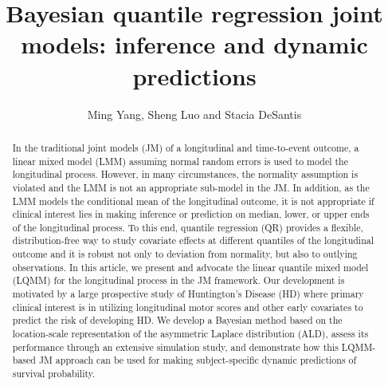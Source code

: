 \documentclass[Crown, sagev, times, doublespace]{sagej}
\begin{document}

\title{Bayesian quantile regression joint models: inference and dynamic predictions}

\author{Ming Yang, Sheng Luo and Stacia DeSantis}




\begin{abstract}
In the traditional joint models (JM) of a longitudinal and time-to-event outcome, a linear mixed model (LMM) assuming normal random errors is used to model the longitudinal process. However, in many circumstances, the normality assumption is violated and the LMM is not an appropriate sub-model in the JM. In addition, as the LMM models the conditional mean of the longitudinal outcome, it is not appropriate if clinical interest lies in making inference or prediction on median, lower, or upper ends of the longitudinal process. To this end, quantile regression (QR) provides a flexible, distribution-free way to study covariate effects at different quantiles of the longitudinal outcome and it is robust not only to deviation from normality, but also to outlying observations. In this article, we present and advocate the linear quantile mixed model (LQMM) for the longitudinal process in the JM framework. Our development is motivated by a large prospective study of Huntington's Disease (HD) where primary clinical interest is in utilizing longitudinal motor scores and other early covariates to predict the risk of developing HD. We develop a Bayesian method based on the location-scale representation of the asymmetric Laplace distribution (ALD), assess its performance through an extensive simulation study, and demonstrate how this LQMM-based JM approach can be used for making subject-specific dynamic predictions of survival probability.
\end{abstract}

\end{document}
